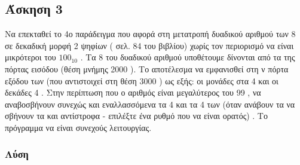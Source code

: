 \newpage\subsection*{Άσκηση 3}

Να επεκταθεί το 4ο παράδειγμα που αφορά στη μετατροπή δυαδικού αριθμού 
των 8  σε δεκαδική μορφή 2 ψηφίων ( σελ. 84 του βιβλίου) χωρίς τον περιορισμό να είναι μικρότεροι του $100_10$ . 
Τα 8  του δυαδικού αριθμού υποθέτουμε δίνονται από τα  της πόρτας εισόδου (θέση  μνήμης  2000 
).  Το  αποτέλεσμα  να  εμφανισθεί  στη ν  πόρτα  εξόδου  των  (που αντιστοιχεί  στη 
θέση 3000 )  ως  εξής:  οι  μονάδες  στα  4    και  οι  δεκάδες  4  .  Στην περίπτωση που ο αριθμός είναι μεγαλύτερος του 99 ,
να αναβοσβήνουν συνεχώς και εναλλασσόμενα τα 4  και τα 4   των  (όταν ανάβουν τα  να  σβήνουν τα  και αντίστροφα 
- επιλέξτε ένα ρυθμό που να είναι ορατός) . Το πρόγραμμα να είναι συνεχούς λειτουργίας.

\subsubsection*{Λύση}

\inputminted{text}{./askisi3.8085}


